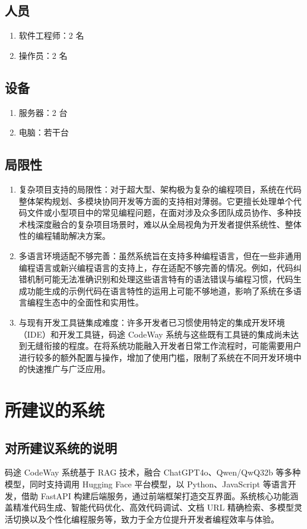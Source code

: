 \documentclass[
    report,     %
    oneside,    %
    UTF8,       %
    zihao=-4    %
]{config} %
\begin{document}
\subsection{人员}
\begin{enumerate}[label=(\arabic*)]
    \item 软件工程师：2 名
    \item 操作员：2 名
\end{enumerate}
\subsection{设备}
\begin{enumerate}[label=(\arabic*)]
    \item 服务器：2 台
    \item 电脑：若干台
\end{enumerate}
\subsection{局限性}
\begin{enumerate}[label=(\arabic*)]
    \item 复杂项目支持的局限性：对于超大型、架构极为复杂的编程项目，系统在代码整体架构规划、多模块协同开发等方面的支持相对薄弱。它更擅长处理单个代码文件或小型项目中的常见编程问题，在面对涉及众多团队成员协作、多种技术栈深度融合的复杂项目场景时，难以从全局视角为开发者提供系统性、整体性的编程辅助解决方案。
    \item 多语言环境适配不够完善：虽然系统旨在支持多种编程语言，但在一些非通用编程语言或新兴编程语言的支持上，存在适配不够完善的情况。例如，代码纠错机制可能无法准确识别和处理这些语言特有的语法错误与编程习惯，代码生成功能生成的示例代码在语言特性的运用上可能不够地道，影响了系统在多语言编程生态中的全面性和实用性。
    \item 与现有开发工具链集成难度：许多开发者已习惯使用特定的集成开发环境（IDE）和开发工具链，码途 CodeWay 系统与这些既有工具链的集成尚未达到无缝衔接的程度。在将系统功能融入开发者日常工作流程时，可能需要用户进行较多的额外配置与操作，增加了使用门槛，限制了系统在不同开发环境中的快速推广与广泛应用。
\end{enumerate}
\section{所建议的系统}
\subsection{对所建议系统的说明}
码途 CodeWay 系统基于 RAG 技术，融合 ChatGPT4o、Qwen/QwQ32b 等多种模型，同时支持调用 Hugging Face 平台模型，以 Python、JavaScript 等语言开发，借助 FastAPI 构建后端服务，通过前端框架打造交互界面。系统核心功能涵盖精准代码生成、智能代码优化、高效代码调试、文档 URL 精确检索、多模型灵活切换以及个性化编程服务等，致力于全方位提升开发者编程效率与体验。
\end{document}

